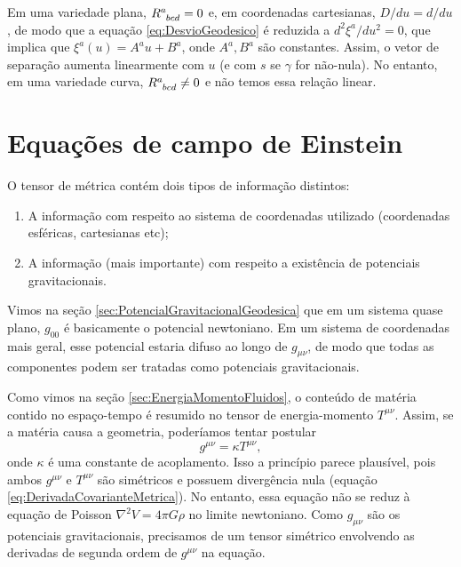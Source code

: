 Em uma variedade plana, $\tensor{R}{^a_{bcd}}=0$ e, em coordenadas cartesianas, $D/du=d/du$, de modo que a equação \eqref{eq:DesvioGeodesico} é reduzida a $d^2\xi^a/du^2=0$, que implica que $\xi^a(u)=A^a u+B^a$, onde $A^a,B^a$ são constantes. Assim, o vetor de separação aumenta linearmente com $u$ (e com $s$ se $\gamma$ for não-nula). No entanto, em uma variedade curva, $\tensor{R}{^a_{bcd}}\neq0$ e não temos essa relação linear.

\section{Equações de campo de Einstein}\label{sec:EquacoesCampoEinstein}

O tensor de métrica contém dois tipos de informação distintos:
\begin{enumerate}[label=\textbf{(\roman*)}]
	\item A informação com respeito ao sistema de coordenadas utilizado (coordenadas esféricas, cartesianas etc);
	\item A informação (mais importante) com respeito a existência de potenciais gravitacionais.
\end{enumerate}

Vimos na seção \ref{sec:PotencialGravitacionalGeodesica} que em um sistema quase plano, $g_{00}$ é basicamente o potencial newtoniano. Em um sistema de coordenadas mais geral, esse potencial estaria difuso ao longo de $g_{\mu\nu}$, de modo que todas as componentes podem ser tratadas como potenciais gravitacionais.

Como vimos na seção \ref{sec:EnergiaMomentoFluidos}, o conteúdo de matéria contido no espaço-tempo é resumido no tensor de energia-momento $T^{\mu\nu}$. Assim, se a matéria causa a geometria, poderíamos tentar postular
\[
	g^{\mu\nu}=\kappa T^{\mu\nu},
\]
onde $\kappa$ é uma constante de acoplamento. Isso a princípio parece plausível, pois ambos $g^{\mu\nu}$ e $T^{\mu\nu}$ são simétricos e possuem divergência nula (equação \eqref{eq:DerivadaCovarianteMetrica}). No entanto, essa equação não se reduz à equação de Poisson $\nabla^2V=4\pi G\rho$ no limite newtoniano. Como $g_{\mu\nu}$ são os potenciais gravitacionais, precisamos de um tensor simétrico envolvendo as derivadas de segunda ordem de $g^{\mu\nu}$ na equação.

